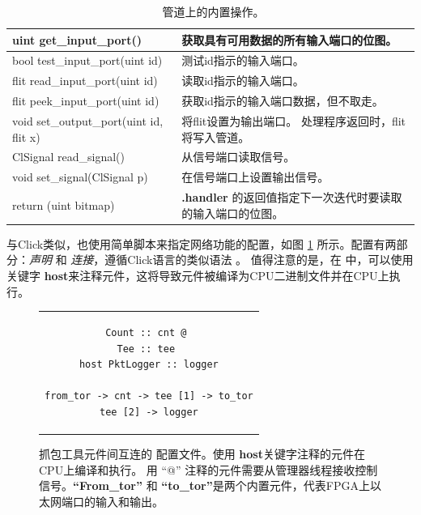 \begin{table}
	\centering
	\caption{\name\ 管道上的内置操作。}
	\label{clicknp:tab:built-in}
	\small
	\begin{tabular}{p{}|p{}}
		\toprule
		uint get\_input\_port() & 获取具有可用数据的所有输入端口的位图。 \\
		\midrule
		bool test\_input\_port(uint id) & 测试id指示的输入端口。 \\
		\midrule
		flit read\_input\_port(uint id) & 读取id指示的输入端口。 \\
		\midrule
		flit peek\_input\_port(uint id) & 获取id指示的输入端口数据，但不取走。 \\
		\midrule
		void set\_output\_port(uint id, flit x) & 将flit设置为输出端口。 处理程序返回时，flit将写入管道。\\
		\midrule
		ClSignal read\_signal() & 从信号端口读取信号。\\
		\midrule
		void set\_signal(ClSignal p) & 在信号端口上设置输出信号。\\
		\midrule
		return (uint bitmap) & \textbf{.handler} 的返回值指定下一次迭代时要读取的输入端口的位图。 \\
		\bottomrule
	\end{tabular}
\end{table}


与Click类似，\name 也使用简单脚本来指定网络功能的配置，如图 \ref{clicknp:fig:logger-config} 所示。配置有两部分：\textit {声明} 和 \textit {连接}，遵循Click语言的类似语法 \cite {kohler2000click}。
值得注意的是，在 \name 中，可以使用关键字 \textbf {host}来注释元件，这将导致元件被编译为CPU二进制文件并在CPU上执行。


\begin{figure}[htbp]
\small
\centering
\begin{tabular}{c}
\begin{lstlisting}
Count :: cnt @ 
Tee :: tee 
host PktLogger :: logger

from_tor -> cnt -> tee [1] -> to_tor
tee [2] -> logger
\end{lstlisting}
\end{tabular}
	\caption{抓包工具元件间互连的 \name 配置文件。使用 \textbf {host}关键字注释的元件在CPU上编译和执行。 用 ``@'' 注释的元件需要从管理器线程接收控制信号。\textbf {``From\_tor''} 和 \textbf {``to\_tor''}是两个内置元件，代表FPGA上以太网端口的输入和输出。}
	\label{clicknp:fig:logger-config}
\end{figure}



